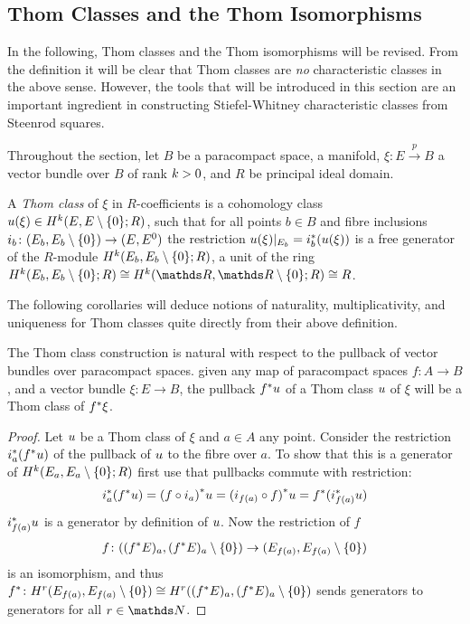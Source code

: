 \subsection{Thom Classes and the Thom Isomorphisms}\label{sec:thomclasses}
In the following, Thom classes and the Thom isomorphisms will be
revised. From the definition it will be clear that Thom classes are
\emph{no} characteristic classes in the above sense. However, the
tools that will be introduced in this section are an important
ingredient in constructing Stiefel-Whitney characteristic classes from
Steenrod squares.

Throughout the section,
let $B$ be a paracompact space, \forexample a manifold,
$\xi\colon E\xrightarrow{p} B$ a vector bundle over $B$ of rank $k>0$,
and $R$ be principal ideal domain.
\begin{Def}
  A \emph{Thom class} of $\xi$ in $R$-coefficients is a
  cohomology class ${u}(\xi)\in H^{k}(E, {E}\setminus\{0\}; R)$,
  such that for all points $b\in B$ and fibre inclusions
  $i_b\colon (E_b, {E_b}\setminus\{0\}) \to (E, {E}^0)$
  the restriction ${u}(\xi)|_{E_b} = {i}^*_b ({u}(\xi))$ is a
  free generator of the $R$-module $H^{k}(E_b, {E_b}\setminus\{0\}; R)$,
  \idest a unit
  of the ring
  $\H^{\rkk}(\spherepair{E_b};R)\cong \H^{\rkk}(\spherepair{\R}; R)\cong R$.
\end{Def}

The following corollaries will deduce notions of naturality,
multiplicativity, and uniqueness for Thom classes quite directly from
their above definition.

\begin{Cor}\label{cor:thomclsnatural}
  The Thom class construction is natural with respect to the pullback
  of vector bundles over paracompact spaces.
  \Idest given any map of paracompact spaces $f\colon A\to B$, and a
  vector bundle $\xi\colon E\to B$,
  the pullback ${f}^* u$ of a Thom class $u$ of $\xi$ will
  be a Thom class of ${f}^* \xi$.
  \begin{proof}
    Let $u$ be a Thom class of $\xi$ and $a\in A$ any point.
    Consider the restriction ${i}^*_a({f}^* u)$
    of the pullback of $u$ to the fibre over $a$. To show that this
    is a generator of $H^{k}(E_a, {E_a}\setminus\{0\};R)$ first use that
    pullbacks commute with restriction:
    \begin{gather*}
      {i}^*_a({f}^* u)
      = {(f\circ i_a)}^* u
      = {(i_{f(a)}\circ f)}^* u
      = {f}^* ({i}^*_{f(a)} u)
    \end{gather*}
    ${i}^*_{f(a)} u$ is a generator by definition of $u$.
    Now the restriction of $f$
    \begin{gather*}
      f\colon (({f}^* E)_a, {({f}^* E)_a}\setminus\{0\}) \to (E_{f(a)}, {E_{f(a)}}\setminus\{0\})
    \end{gather*}
    is an isomorphism, and thus
    ${f}^*\colon H^r(E_{f(a)}, {E_{f(a)}}\setminus\{0\})
    \cong H^r(({f}^* E)_a, {({f}^* E)_a}\setminus\{0\})$
    sends generators to generators for all $r\in\Nat$.
  \end{proof}
\end{Cor}

